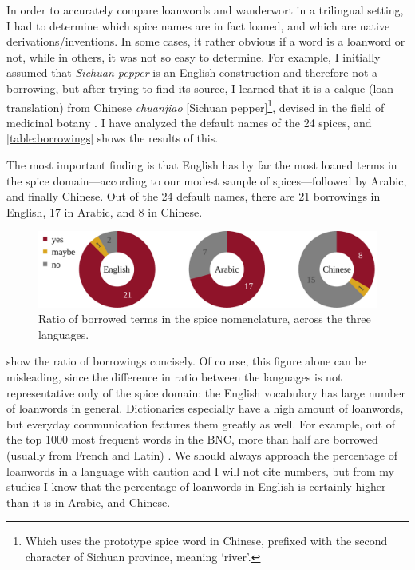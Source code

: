 In order to accurately compare loanwords and \gls{wanderwort} in a trilingual setting, I had to determine which spice names are in fact loaned, and which are native derivations/inventions. In some cases, it rather obvious if a word is a loanword or not, while in others, it was not so easy to determine. For example, I initially assumed that \textit{Sichuan pepper} is an English construction and therefore not a borrowing, but after trying to find its source, I learned that it is a calque (loan translation) from Chinese  \textit{chuanjiao} [Sichuan pepper]\footnote{Which uses the prototype spice word in Chinese, prefixed with the second character of Sichuan province, meaning `river'.}, devised in the field of medicinal botany \autocite[140]{hooper_chinese_1929}. I have analyzed the default names of the 24 spices, and \cref{table:borrowings} shows the results of this.

The most important finding is that English has by far the most loaned terms in the spice domain---according to our modest sample of spices---followed by Arabic, and finally Chinese. Out of the 24 default names, there are 21 borrowings in English, 17 in Arabic, and 8 in Chinese. 

\begin{figure}[ht!]
    \includegraphics[width=\linewidth]{imgs/plots/borrowings_pie.pdf}
    \caption[{Ratio of borrowed and not borrowed terms in the spice nomenclature.}]{Ratio of borrowed terms in the spice nomenclature, across the three languages.}
    \label{fig:borrowings_pie}
\end{figure}

 show the ratio of borrowings concisely. Of course, this figure alone can be misleading, since the difference in ratio between the languages is not representative only of the spice domain: the English vocabulary has large number of loanwords in general. Dictionaries especially have a high amount of loanwords, but everyday communication features them greatly as well. For example, out of the top 1000 most frequent words in the \gls{BNC}, more than half are borrowed (usually from French and Latin) \autocite[38]{durkin_borrowed_2014}. We should always approach the percentage of loanwords in a language with caution and I will not cite numbers, but from my studies I know that the percentage of loanwords in English is certainly higher than it is in Arabic, and Chinese. 


